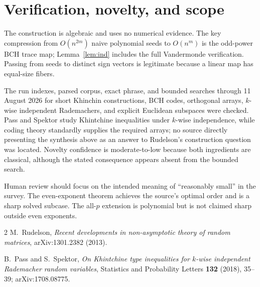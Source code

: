 \documentclass[11pt]{article}
\begin{document}
\section{Verification, novelty, and scope}

The construction is algebraic and uses no numerical evidence.  The key
compression from $O(n^{2m})$ naive polynomial seeds to $O(n^m)$ is the
odd-power BCH trace map; Lemma~\ref{lem:ind} includes the full
Vandermonde verification.  Passing from seeds to distinct sign vectors is
legitimate because a linear map has equal-size fibers.

The run indexes, parsed corpus, exact phrase, and bounded searches through
11 August 2026 for short Khinchin constructions, BCH codes, orthogonal
arrays, $k$-wise independent Rademachers, and explicit Euclidean
subspaces were checked.  Pass and Spektor \cite{PassSpektor} study
Khintchine inequalities under $k$-wise independence, while coding theory
standardly supplies the required arrays; no source directly presenting
the synthesis above as an answer to Rudelson's construction question was
located.  Novelty confidence is moderate-to-low because both ingredients
are classical, although the stated consequence appears absent from the
bounded search.

Human review should focus on the intended meaning of ``reasonably small''
in the survey.  The even-exponent theorem achieves the source's optimal
order and is a sharp solved subcase.  The all-$p$ extension is polynomial
but is not claimed sharp outside even exponents.

\begin{thebibliography}{2}
M.~Rudelson,
\newblock \emph{Recent developments in non-asymptotic theory of random
matrices},
\newblock arXiv:1301.2382 (2013).

B.~Pass and S.~Spektor,
\newblock \emph{On Khintchine type inequalities for $k$-wise independent
Rademacher random variables},
\newblock Statistics and Probability Letters \textbf{132} (2018), 35--39;
arXiv:1708.08775.
\end{thebibliography}
\end{document}

